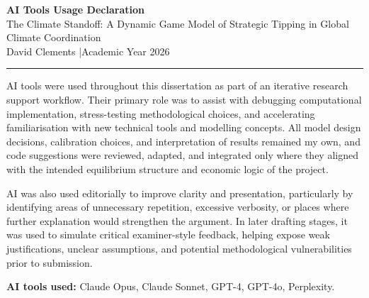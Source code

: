 \documentclass[10pt,a4paper]{article}
\begin{document}
\begin{center}
{\large\textbf{AI Tools Usage Declaration}}\\[0.3em]
{\small The Climate Standoff: A Dynamic Game Model of Strategic Tipping
in Global Climate Coordination}\\[0.2em]
{\small David Clements \quad|\quad Academic Year 2026}
\end{center}

\smallskip
\hrule
\smallskip

AI tools were used throughout this dissertation as part of an iterative research
support workflow. Their primary role was to assist with debugging computational
implementation, stress-testing methodological choices, and accelerating
familiarisation with new technical tools and modelling concepts. All model design
decisions, calibration choices, and interpretation of results remained my own, and
code suggestions were reviewed, adapted, and integrated only where they aligned with
the intended equilibrium structure and economic logic of the project.

AI was also used editorially to improve clarity and presentation, particularly by
identifying areas of unnecessary repetition, excessive verbosity, or places where
further explanation would strengthen the argument. In later drafting stages, it was
used to simulate critical examiner-style feedback, helping expose weak justifications,
unclear assumptions, and potential methodological vulnerabilities prior to submission.

\textbf{AI tools used:} Claude Opus, Claude Sonnet, GPT-4, GPT-4o, Perplexity.

\smallskip
\end{document}
